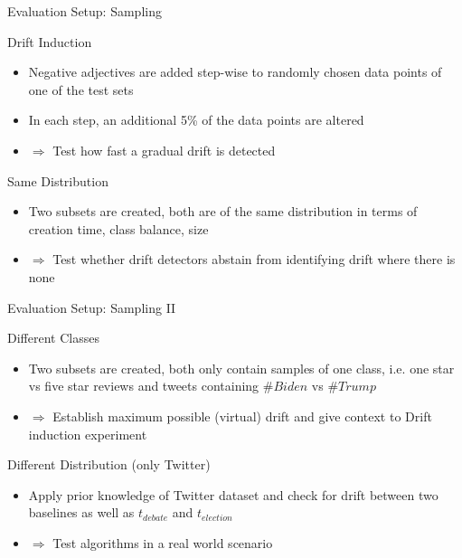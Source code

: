 \documentclass{beamer} %
\begin{document}
	\begin{frame}{Evaluation Setup: Sampling}
		\begin{alertblock}{Drift Induction}
			\begin{itemize}
				\item Negative adjectives are added step-wise to randomly chosen data points of one of the test sets
				\item In each step, an additional 5\% of the data points are altered
				\item $\Rightarrow$ Test how fast a gradual drift is detected
			\end{itemize}
		\end{alertblock}
	
		\begin{alertblock}{Same Distribution}
			\begin{itemize}
				\item Two subsets are created, both are of the same distribution in terms of creation time, class balance, size
				\item $\Rightarrow$ Test whether drift detectors abstain
from identifying drift where there is none
			\end{itemize}
		\end{alertblock}
	\end{frame}
	
	\begin{frame}{Evaluation Setup: Sampling II}
		\begin{alertblock}{Different Classes}
			\begin{itemize}
				\item Two subsets are created, both only contain samples of one class, i.e. one star vs five star reviews and tweets containing $\#Biden$ vs $\#Trump$
				\item $\Rightarrow$ Establish maximum possible (virtual) drift and give context to Drift induction experiment
			\end{itemize}
		\end{alertblock}
	
		\begin{alertblock}{Different Distribution (only Twitter)}
			\begin{itemize}
				\item Apply prior knowledge of Twitter dataset and check for drift between two baselines as well as $t_{debate}$ and $t_{election}$
				\item $\Rightarrow$ Test algorithms in a real world scenario
			\end{itemize}
		\end{alertblock}
	\end{frame}
\end{document}
